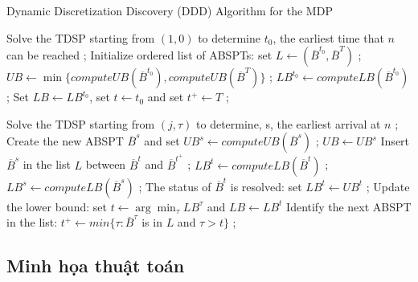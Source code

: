 \documentclass[../main.tex]{subfiles}
\begin{document}
\begin{algorithm}[H]
\caption{Dynamic Discretization Discovery (DDD) Algorithm for the MDP}
\label{algo:1}
\begin{algorithmic}

\State Solve the TDSP starting from $(1, 0)$ to determine $t_0$, the earliest time that $n$ can be reached ;
\State Initialize ordered list of ABSPTs: set $L \leftarrow (\overline{B}^{t_0}, \overline{B}^{T})$  ;
\State $UB \leftarrow \min\{ computeUB(\overline{B}^{t_0}), computeUB(\overline{B}^{T})\}$ ;
\State $LB^{t_0} \leftarrow computeLB(\overline{B}^{t_0})$ ;
\State Set $LB \leftarrow LB^{t_0}$, set $t \leftarrow t_0$ and set $t^+ \leftarrow T$ ;

        \State Solve the TDSP starting from $(j, \tau)$ to determine, s, the earliest arrival at $n$ ;
        \State Create the new ABSPT $\overline{B}^s$ and set $UB^s \leftarrow computeUB(\overline{B}^s)$ ;
            \State $UB \leftarrow UB^s$
        \EndIf
        \State Insert $\overline{B}^s$ in the list $L$ between $\overline{B}^t$ and $\overline{B}^{t^+}$ ;
        \State $LB^t \leftarrow computeLB(\overline{B}^t)$ ;
        \State $LB^s \leftarrow computeLB(\overline{B}^s)$ ;
    \Else
        \State The status of $\overline{B}^t$ is resolved: set $LB^t \leftarrow UB^t$ ;
    \EndIf
    \State Update the lower bound: set $t \leftarrow \arg\min_{\tau}LB^{\tau}$ and $LB\leftarrow LB^t$ 
    \State Identify the next ABSPT in the list: $t^+ \leftarrow min\{\tau : \overline{B}^{\tau}$ is in $L$ and $\tau > t \}$ ;
\EndWhile
  
  \end{algorithmic}
\end{algorithm}

\subsection{Minh họa thuật toán}\label{minh-houx1ea1-thuux1eadt-touxe1n}
\end{document}
